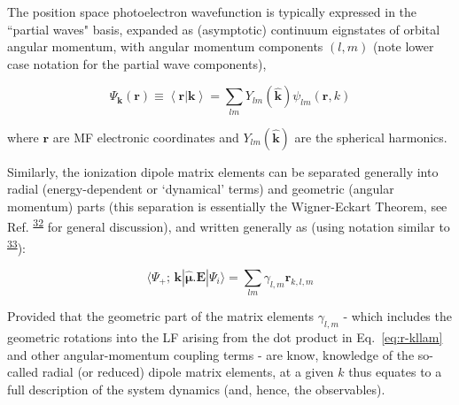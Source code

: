 \documentclass[10pt]{article}
\begin{document}
The position space photoelectron wavefunction is typically expressed in the ``partial waves" basis, expanded as (asymptotic) continuum eignstates of orbital angular momentum, with angular momentum components $(l,m)$ (note lower case notation for the partial wave components),  

\begin{equation}
\Psi_\mathbf{k}(\bm{r})\equiv\left<\bm{r}|\mathbf{k}\right> = \sum_{lm}Y_{lm}(\mathbf{\hat{k}})\psi_{lm}(\bm{r},k)
\label{eq:elwf}
\end{equation}

where $\bm{r}$ are MF electronic coordinates and $Y_{lm}(\mathbf{\hat{k}})$ are the spherical harmonics.

Similarly, the ionization dipole matrix elements can be separated generally into radial (energy-dependent or `dynamical' terms) and geometric (angular momentum) parts (this separation is essentially the Wigner-Eckart Theorem, see Ref. \textsuperscript{\hyperref[csl:32]{32}} for general discussion), and written generally as (using notation similar to \textsuperscript{\hyperref[csl:33]{33}}): 

\begin{equation}
\langle\Psi_{+};\,\mathbf{k}|\hat{\mathbf{\mu}}.\boldsymbol{\mathbf{E}}|\Psi_{i}\rangle = \sum_{lm}\gamma_{l,m}\mathbf{r}_{k,l,m}
\label{eq:r-kllam}
\end{equation}


Provided that the geometric part of the matrix elements $\gamma_{l,m}$ - which includes the geometric rotations  into the LF arising from the dot product in Eq.~\ref{eq:r-kllam} and other angular-momentum coupling terms - are know, knowledge of the so-called radial (or reduced) dipole matrix elements, at a given 
$k$ %
thus equates to a full description of the system dynamics (and, hence, the observables).

\end{document}
